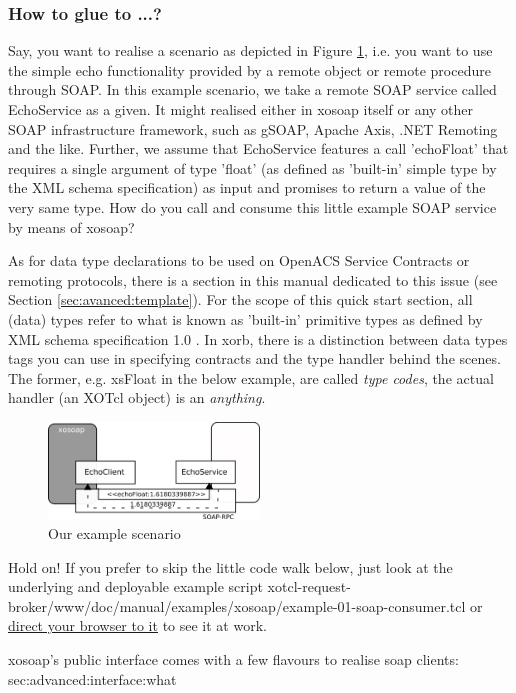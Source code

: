   \subsubsection{How to glue to ...?}\label{sec:xosoap:quickstart:glueto}
  Say, you want to realise a scenario as depicted in Figure \ref{fig:quickstart:xosoap:1}, i.e. you want to 
use the simple echo functionality provided by a remote object or remote procedure through SOAP. In this 
example scenario, we take a remote SOAP service called EchoService as a given. It might realised 
either in xosoap itself or any other SOAP infrastructure framework, such as gSOAP, Apache Axis, .NET 
Remoting and the like. Further, we assume that  EchoService features a call 'echoFloat' that requires a 
single argument of type 'float' (as defined as 'built-in' simple type by the XML schema specification) as 
input and promises to return a value of the very same type. How do you call and consume this little 
example SOAP service by means of xosoap?
\begin{hints}
\item As for data type declarations to be used on OpenACS Service Contracts or remoting protocols, there is a section in this manual dedicated to this issue (see Section \ref{sec:avanced:template}). For the scope of this quick start section, all (data) types refer to what is known as 'built-in' primitive types as defined by  XML schema specification 1.0 \cite{w3c:2004}. In xorb, there is a distinction between data types tags you can use in specifying contracts and the type handler behind the scenes. The former, e.g. xsFloat in the below example, are called \emph{type codes}, the actual handler  (an XOTcl object) is an \emph{anything}.
\end{hints}
\begin{figure}[htbp]
\begin{center}
\includegraphics[width=0.5\textwidth]{img/consumer.png}
\caption{Our example scenario}
\label{fig:quickstart:xosoap:1}
\end{center}
\end{figure}
\begin{hints}
\item Hold on! If you prefer to skip the little code walk below, just look at the underlying and deployable 
example script xotcl-request-broker/www/doc/manual/examples/xosoap/example-01-soap-consumer.tcl 
or \href{http://openacs-dotlrn.wu-wien.ac.at/request-broker/doc/manual/examples/xosoap/example-01-
soap-consumer.tcl}{direct your browser to it} to see it at work.
\item xosoap's public interface comes with a few flavours to realise soap clients: \nameref
{sec:advanced:interface:what}
\end{hints}
